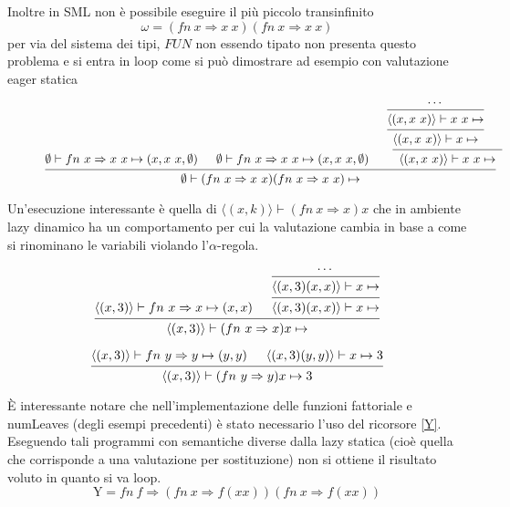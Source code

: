 \documentclass[a4paper]{article}
\begin{document}
	Inoltre in SML non è possibile eseguire il più piccolo transinfinito 
	\[ \omega = (fn \ x \Rightarrow x \ x)(fn \ x \Rightarrow x \ x) \]
	per via del sistema dei tipi, $FUN$ non essendo tipato non presenta questo problema e si entra in loop come si può dimostrare ad esempio con valutazione eager statica
	
	\begin{figure}[ht]
	\[
		\begin{prooftree}
			\hypo{\emptyset \vdash fn \ x \Rightarrow x \ x \mapsto (x, x \ x, \emptyset)}

			\hypo{\emptyset \vdash fn \ x \Rightarrow x \ x \mapsto (x, x \ x, \emptyset)}

			\hypo{\cdots}
			\infer1[]{\langle (x, x \ x) \rangle \vdash x \ x \mapsto}
			\infer1[]{\langle (x, x \ x) \rangle \vdash x \mapsto}
			\hypo{}
			\infer2[]{\langle (x, x \ x) \rangle \vdash x \ x \mapsto }

			\infer3[]{\emptyset \vdash (fn \ x \Rightarrow x \ x)(fn \ x \Rightarrow x \ x) \mapsto }

		\end{prooftree}
	\]
	\end{figure}
	
	Un'esecuzione interessante è quella di $\langle (x, k) \rangle \vdash (fn \ x \Rightarrow x)x$ che in ambiente lazy dinamico ha un comportamento per cui la valutazione cambia in base a come si rinominano le variabili violando l'$\alpha$-regola.  

	\begin{figure}[H]
	\[
		\begin{prooftree}
			\hypo{\langle (x,3) \rangle \vdash fn \ x \Rightarrow x \mapsto (x,x)}
			\hypo{\cdots}
			\infer1[]{\langle (x,3)(x,x) \rangle \vdash x \mapsto }
			\infer1[]{\langle (x,3)(x,x) \rangle \vdash x \mapsto }
			\infer2[]{\langle (x,3) \rangle \vdash (fn \ x \Rightarrow x) x \mapsto }
		\end{prooftree}
	\]
	\end{figure}


	\begin{figure}[H]
	\[
		\begin{prooftree}
			\hypo{\langle (x,3) \rangle \vdash fn \ y \Rightarrow y \mapsto (y,y)}
			\hypo{\langle (x,3)(y,y) \rangle \vdash x \mapsto 3}
			\infer2[]{\langle (x,3) \rangle \vdash (fn \ y \Rightarrow y)x \mapsto 3}
		\end{prooftree}
	\]
	\end{figure}

	È interessante notare che nell'implementazione delle funzioni fattoriale e numLeaves (degli esempi precedenti) è stato necessario l'uso del ricorsore \eqref{Y}. Eseguendo tali programmi con semantiche diverse dalla lazy statica (cioè quella che corrisponde a una valutazione per sostituzione) non si ottiene il risultato voluto in quanto si va loop. 
	\begin{equation} \label{Y}
	\mathrm{Y}= fn \ f \Rightarrow (fn \ x \Rightarrow f(xx))(fn \ x \Rightarrow f(xx))
	\end{equation}
\end{document}

